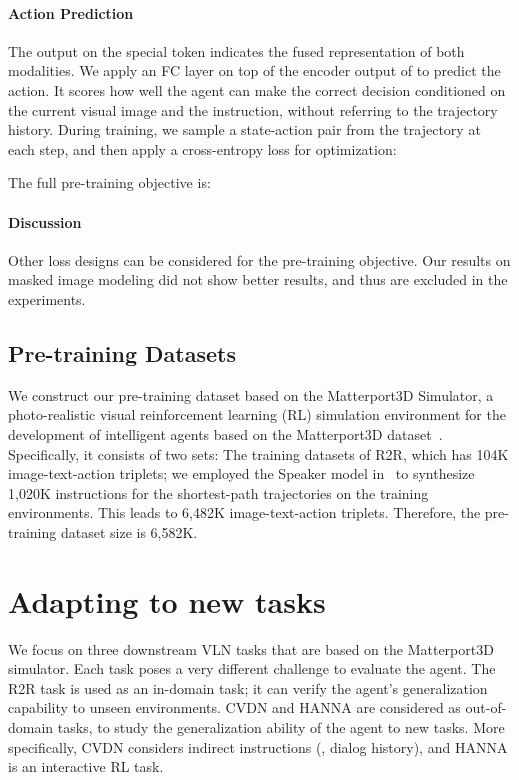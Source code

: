 \documentclass[10pt,twocolumn,letterpaper]{article}
\begin{document}
\paragraph{Action Prediction} 
The output on the special token  indicates the fused representation of both modalities. We apply an FC layer on top of the encoder output of  to predict the action. It scores how well the agent can make the correct decision conditioned on the current visual image and the instruction, without referring to the trajectory history. During training, we sample a state-action pair  from the trajectory  at each step, and then apply a cross-entropy loss for optimization:

The full pre-training objective is: 




\paragraph{Discussion} Other loss designs can be considered for the pre-training objective. Our results on masked image modeling did not show better results, and thus are excluded in the experiments. 



\subsection{Pre-training Datasets}
We construct our pre-training dataset based on the Matterport3D Simulator, a photo-realistic visual reinforcement learning (RL) simulation environment for the development of intelligent agents based on the Matterport3D dataset~\cite{chang2017matterport3d}.
Specifically, it consists of two sets: 
 The training datasets of R2R, which has 104K image-text-action triplets; 
 we employed the Speaker model in~\cite{fried2018speaker} to synthesize 1,020K instructions for the shortest-path trajectories on the training environments. This leads to 6,482K image-text-action triplets. Therefore, the pre-training dataset size is 6,582K.


\section{Adapting to new tasks}
We focus on three downstream VLN tasks that are based on the Matterport3D simulator.
Each task poses a very different challenge to evaluate the agent. 
 The R2R task is used as an in-domain task; it can verify the agent's generalization capability to unseen environments. 
 CVDN and HANNA are considered as out-of-domain tasks, to study the generalization ability of the agent to new tasks. More specifically, CVDN considers indirect instructions (\ie, dialog history), and HANNA is an interactive RL task.
\end{document}
